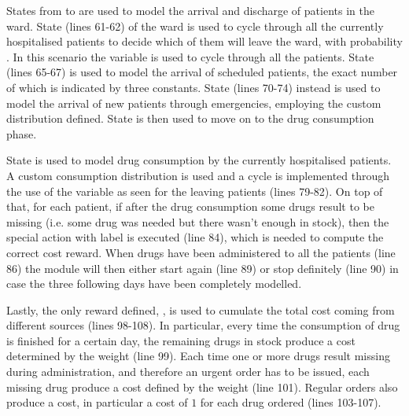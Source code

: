 {      States from  to  are used to model the arrival and discharge of patients in the ward. State  (lines 61-62) of the ward is used to cycle through all the currently hospitalised patients to decide which of them will leave the ward, with probability . In this scenario the  variable is used to cycle through all the patients. State  (lines 65-67) is used to model the arrival of scheduled patients, the exact number of which is indicated by three constants. State  (lines 70-74) instead is used to model the arrival of new patients through emergencies, employing the custom distribution defined. State  is then used to move on to the drug consumption phase.
      
      State  is used to model drug consumption by the currently hospitalised patients. A custom consumption distribution is used and a cycle is implemented through the use of the  variable as seen for the leaving patients (lines 79-82). On top of that, for each patient, if after the drug consumption some drugs result to be missing (i.e. some drug was needed but there wasn't enough in stock), then the special action with label  is executed (line 84), which is needed to compute the correct cost reward. When drugs have been administered to all the patients (line 86) the module will then either start again (line 89) or stop definitely (line 90) in case the three following days have been completely modelled.
      
      Lastly, the only reward defined, , is used to cumulate the total cost coming from different sources (lines 98-108). In particular, every time the consumption of drug is finished for a certain day, the remaining drugs in stock produce a cost determined by the weight  (line 99). Each time one or more drugs result missing during administration, and therefore an urgent order has to be issued, each missing drug produce a cost defined by the weight  (line 101). Regular orders also produce a cost, in particular a cost of $1$ for each drug ordered (lines 103-107).
    }
